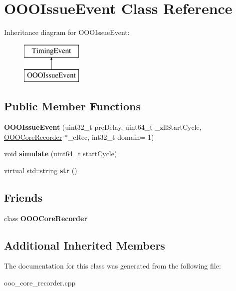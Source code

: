\hypertarget{classOOOIssueEvent}{\section{O\-O\-O\-Issue\-Event Class Reference}
\label{classOOOIssueEvent}
}
Inheritance diagram for O\-O\-O\-Issue\-Event\-:\begin{figure}[H]
\begin{center}
\leavevmode
\includegraphics[height=2.000000cm]{classOOOIssueEvent}
\end{center}
\end{figure}
\subsection*{Public Member Functions}
\begin{DoxyCompactItemize}
\item 
\hypertarget{classOOOIssueEvent_a84a21a967f11f5597e51baf2c6fa5378}{{\bfseries O\-O\-O\-Issue\-Event} (uint32\-\_\-t pre\-Delay, uint64\-\_\-t \-\_\-zll\-Start\-Cycle, \hyperlink{classOOOCoreRecorder}{O\-O\-O\-Core\-Recorder} $\ast$\-\_\-c\-Rec, int32\-\_\-t domain=-\/1)}\label{classOOOIssueEvent_a84a21a967f11f5597e51baf2c6fa5378}

\item 
\hypertarget{classOOOIssueEvent_aaf602985eb940dae0378d1ab57357dd4}{void {\bfseries simulate} (uint64\-\_\-t start\-Cycle)}\label{classOOOIssueEvent_aaf602985eb940dae0378d1ab57357dd4}

\item 
\hypertarget{classOOOIssueEvent_ad6d4b5c5c3be90206a750dec334b4467}{virtual std\-::string {\bfseries str} ()}\label{classOOOIssueEvent_ad6d4b5c5c3be90206a750dec334b4467}

\end{DoxyCompactItemize}
\subsection*{Friends}
\begin{DoxyCompactItemize}
\item 
\hypertarget{classOOOIssueEvent_a37611ab84823dbefbe11233ca80682d0}{class {\bfseries O\-O\-O\-Core\-Recorder}}\label{classOOOIssueEvent_a37611ab84823dbefbe11233ca80682d0}

\end{DoxyCompactItemize}
\subsection*{Additional Inherited Members}


The documentation for this class was generated from the following file\-:\begin{DoxyCompactItemize}
\item 
ooo\-\_\-core\-\_\-recorder.\-cpp\end{DoxyCompactItemize}
